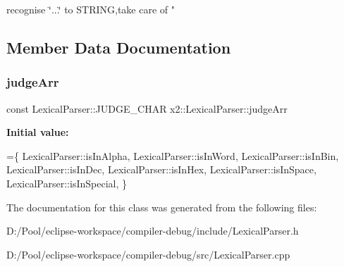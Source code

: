 recognise \char`\"{}...\char`\"{} to S\+T\+R\+I\+NG,take care of " 

\subsection{Member Data Documentation}
\mbox{\label{classx2_1_1_lexical_parser_a3af5a3f209ae8743b5548b5148da8948}} 
\subsubsection{\texorpdfstring{judge\+Arr}{judgeArr}}
{\footnotesize\ttfamily const Lexical\+Parser\+::\+J\+U\+D\+G\+E\+\_\+\+C\+H\+AR x2\+::\+Lexical\+Parser\+::judge\+Arr\hspace{0.3cm}{\ttfamily [static]}}

{\bfseries Initial value\+:}
\begin{DoxyCode}
=\{
        LexicalParser::isInAlpha,
        LexicalParser::isInWord,
        LexicalParser::isInBin,
        LexicalParser::isInDec,
        LexicalParser::isInHex,
        LexicalParser::isInSpace,
        LexicalParser::isInSpecial,
\}
\end{DoxyCode}


The documentation for this class was generated from the following files\+:\begin{DoxyCompactItemize}
\item 
D\+:/\+Pool/eclipse-\/workspace/compiler-\/debug/include/Lexical\+Parser.\+h\item 
D\+:/\+Pool/eclipse-\/workspace/compiler-\/debug/src/Lexical\+Parser.\+cpp\end{DoxyCompactItemize}
